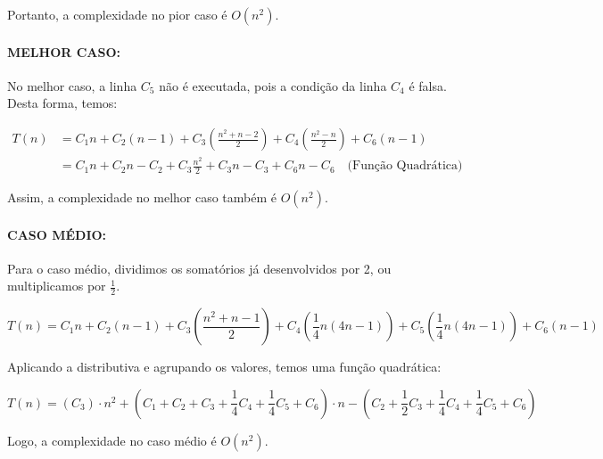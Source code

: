 Portanto, a complexidade no pior caso é \(O(n^2)\).

\paragraph{MELHOR CASO:}
No melhor caso, a linha \(C_5\) não é executada, pois a condição da linha \(C_4\) é falsa. Desta forma, temos:

\begin{align}
T(n) &= C_1n + C_2(n-1) + C_3\left( \frac{n^2 + n - 2}{2} \right) + C_4\left( \frac{n^2 - n}{2} \right) + C_6(n - 1) \nonumber \\
&= C_1n + C_2n - C_2 + C_3\frac{n^2}{2} + C_3n - C_3 + C_6n-C_6 \quad \text{(Função Quadrática)}
\end{align}

Assim, a complexidade no melhor caso também é \(O(n^2)\).

\paragraph{CASO MÉDIO:}
Para o caso médio, dividimos os somatórios já desenvolvidos por 2, ou multiplicamos por \(\frac{1}{2}\). 

\begin{equation}
T(n) = C_1n + C_2(n-1) + C_3\left( \frac{n^2 + n - 1}{2} \right) +C_4\left(\frac{1}{4}n(4n-1)\right) +C_5\left(\frac{1}{4}n(4n-1)\right) +C_6(n-1)
\end{equation}

Aplicando a distributiva e agrupando os valores, temos uma função quadrática:

\begin{equation}
T(n) = (C_3) \cdot n^2 + (C_1 + C_2 + C_3 + \frac{1}{4}C_4 + \frac{1}{4}C_5 + C_6) \cdot n - (C_2 + \frac{1}{2}C_3 + \frac{1}{4}C_4 + \frac{1}{4}C_5 + C_6)
\end{equation}

Logo, a complexidade no caso médio é \(O(n^2)\).